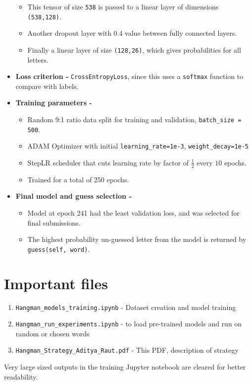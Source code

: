 \documentclass{article}
\begin{document}
\begin{itemize}
\begin{itemize}
		\item This tensor of size \texttt{538} is passed to a linear layer of dimensions \texttt{(538,128)}.
		\item Another dropout layer with 0.4 value between fully connected layers.
		\item Finally a linear layer of size \texttt{(128,26)}, which gives probabilities for all letters.
	\end{itemize}
	\item \textbf{Loss criterion -} \texttt{CrossEntropyLoss}, since this uses a \texttt{softmax} function to compare with labels.
	\item \textbf{Training parameters -}
	\begin{itemize}
		
		\item Random 9:1 ratio data split for training and validation, \texttt{batch\_size = 500}.		
		\item ADAM Optimizer with initial \texttt{learning\_rate=1e-3}, \texttt{weight\_decay=1e-5}
		\item StepLR scheduler that cuts learning rate by factor of $\frac{1}{2}$ every $10$ epochs. 
		\item Trained for a total of 250 epochs.
	\end{itemize}
	\item \textbf{Final model and guess selection -}
	\begin{itemize}
		\item Model at epoch 241 had the least validation loss, and was selected for final submissions.
		\item The highest probability un-guessed letter from the model is returned by \texttt{guess(self, word)}.
	\end{itemize}
\end{itemize}

\vspace{-5pt}
\section{Important files}
\begin{enumerate}
	\item \texttt{Hangman\_models\_training.ipynb} - Dataset creation and model training
	\item \texttt{Hangman\_run\_experiments.ipynb} - to load pre-trained models and run on random or chosen words
	\item \texttt{Hangman\_Strategy\_Aditya\_Raut.pdf} - This PDF, description of strategy
\end{enumerate}
Very large sized outputs in the training Jupyter notebook are cleared for better readability.
\end{document}
